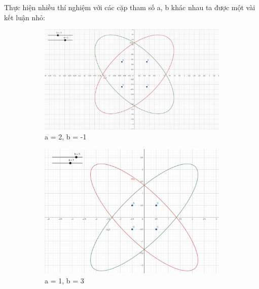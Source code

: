 \documentclass[]{article}
\begin{document}
Thực hiện nhiều thí nghiệm với các cặp tham số a, b khác nhau ta được một vài kết luận nhỏ:
\begin{figure}[!ht]
  \centering
  \begin{subfigure}[b]{0.3\linewidth}
    \includegraphics[width=\linewidth]{image/square_illustrator_1.png}
    \caption{a = 2, b = -1}
  \end{subfigure}
  \begin{subfigure}[b]{0.3\linewidth}
    \includegraphics[width=\linewidth]{image/square_illustrator_2.png}
    \caption{a = 1, b = 3}
  \end{subfigure}
  \begin{subfigure}[b]{0.3\linewidth}

\end{subfigure}
\end{figure}
\end{document}

